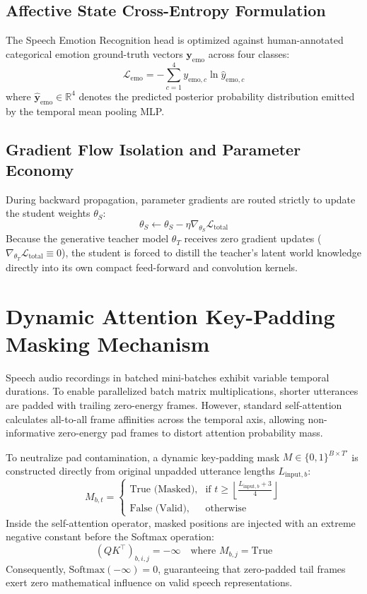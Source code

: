 \subsection{Affective State Cross-Entropy Formulation}
The Speech Emotion Recognition head is optimized against human-annotated categorical emotion ground-truth vectors $\mathbf{y}_{\text{emo}}$ across four classes:
\begin{equation}
    \mathcal{L}_{\text{emo}} = - \sum_{c=1}^4 y_{\text{emo}, c} \ln \hat{y}_{\text{emo}, c}
\end{equation}
where $\hat{\mathbf{y}}_{\text{emo}} \in \mathbb{R}^4$ denotes the predicted posterior probability distribution emitted by the temporal mean pooling MLP.

\subsection{Gradient Flow Isolation and Parameter Economy}
During backward propagation, parameter gradients are routed strictly to update the student weights $\theta_S$:
\begin{equation}
    \theta_S \leftarrow \theta_S - \eta \nabla_{\theta_S} \mathcal{L}_{\text{total}}
\end{equation}
Because the generative teacher model $\theta_T$ receives zero gradient updates ($\nabla_{\theta_T} \mathcal{L}_{\text{total}} \equiv 0$), the student is forced to distill the teacher's latent world knowledge directly into its own compact feed-forward and convolution kernels.

\section{Dynamic Attention Key-Padding Masking Mechanism}
Speech audio recordings in batched mini-batches exhibit variable temporal durations. To enable parallelized batch matrix multiplications, shorter utterances are padded with trailing zero-energy frames. However, standard self-attention calculates all-to-all frame affinities across the temporal axis, allowing non-informative zero-energy pad frames to distort attention probability mass.

To neutralize pad contamination, a dynamic key-padding mask $M \in \{0, 1\}^{B \times T'}$ is constructed directly from original unpadded utterance lengths $L_{\text{input}, b}$:
\begin{equation}
    M_{b, t} = \begin{cases}
        \text{True (Masked)}, & \text{if } t \ge \left\lfloor \frac{L_{\text{input}, b} + 3}{4} \right\rfloor \\
        \text{False (Valid)}, & \text{otherwise}
    \end{cases}
\end{equation}
Inside the self-attention operator, masked positions are injected with an extreme negative constant before the Softmax operation:
\begin{equation}
    (Q K^\top)_{b, i, j} = -\infty \quad \text{where } M_{b, j} = \text{True}
\end{equation}
Consequently, $\text{Softmax}(-\infty) = 0$, guaranteeing that zero-padded tail frames exert zero mathematical influence on valid speech representations.

